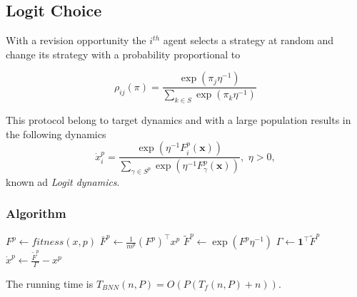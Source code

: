 \documentclass[a4paper,10pt]{article}
\def\th{^{th}}
\newcommand{\bs}[1]{\boldsymbol{#1}}
\def\th{^{th}}
\begin{document}
\subsection{Logit Choice}

With a revision opportunity the $i\th$ agent selects a strategy at random and change its strategy with a probability proportional to 

\begin{equation}
\rho_{ij}(\pi) = \frac{ \exp(\pi_j \eta^{-1} ) }{ \sum_{k \in S} \exp(\pi_k \eta^{-1} ) }
\end{equation}

This protocol belong to target dynamics and with a large population results in the following dynamics
\begin{equation}\label{eq:logit}
 \dot{x}_i^p = \frac{ \exp\left(\eta^{-1} F_i^p (\bs{x}) \right) }{ \sum_{\gamma \in S^p} \exp\left(\eta^{-1} F_\gamma^p (\bs{x}) \right) }, \, \, \eta>0,
\end{equation}
known ad \emph{Logit dynamics}. 



\subsubsection*{Algorithm}

\begin{algorithm}[H]

 \BlankLine
 
  {
  $ F^p \leftarrow fitness(x, p)$\;
  $ \bar{F}^p \leftarrow \frac{1}{m^p} (F^p)^\top x^p$\;
  $ \tilde{F}^p \leftarrow \exp( F^p \eta^{-1} )$\;
  $ \Gamma \leftarrow \boldsymbol{1}^\top \tilde{F}^p $\;
  $ \dot{x}^p \leftarrow \frac{\tilde{F}^p}{\Gamma} - x^p $\;
 }
\end{algorithm}

The running time is $T_{BNN}(n,P) = O( P (  T_{f}(n,P) + n) ) $.

\end{document}
